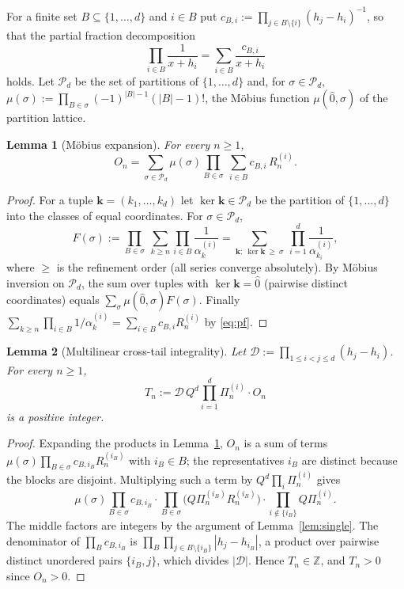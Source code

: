 \documentclass[11pt]{amsart}
\newtheorem{lemma}{Lemma}[section]
\theoremstyle{definition}
\theoremstyle{remark}
\newcommand{\Z}{\mathbb{Z}}
\begin{document}
For a finite set $B\subseteq\{1,\dots,d\}$ and $i\in B$ put
$c_{B,i}:=\prod_{j\in B\setminus\{i\}}(h_j-h_i)^{-1}$, so that the partial fraction
decomposition
\begin{equation}\label{eq:pf}
\prod_{i\in B}\frac1{x+h_i}=\sum_{i\in B}\frac{c_{B,i}}{x+h_i}
\end{equation}
holds. Let $\mathcal P_d$ be the set of partitions of $\{1,\dots,d\}$ and, for
$\sigma\in\mathcal P_d$, $\mu(\sigma):=\prod_{B\in\sigma}(-1)^{|B|-1}(|B|-1)!$, the
M\"obius function $\mu(\hat0,\sigma)$ of the partition lattice.

\begin{lemma}[M\"obius expansion]\label{lem:moebius}
For every $n\ge1$,
\[
O_n=\sum_{\sigma\in\mathcal P_d}\mu(\sigma)\prod_{B\in\sigma}\ \sum_{i\in B}c_{B,i}\,R^{(i)}_n .
\]
\end{lemma}

\begin{proof}
For a tuple $\mathbf k=(k_1,\dots,k_d)$ let $\ker\mathbf k\in\mathcal P_d$ be the partition
of $\{1,\dots,d\}$ into the classes of equal coordinates. For $\sigma\in\mathcal P_d$,
\[
F(\sigma):=\prod_{B\in\sigma}\ \sum_{k\ge n}\prod_{i\in B}\frac1{\alpha_k^{(i)}}
=\sum_{\mathbf k:\ \ker\mathbf k\ \ge\ \sigma}\ \prod_{i=1}^d\frac1{\alpha^{(i)}_{k_i}},
\]
where $\ge$ is the refinement order (all series converge absolutely). By M\"obius
inversion on $\mathcal P_d$, the sum over tuples with $\ker\mathbf k=\hat0$ (pairwise
distinct coordinates) equals $\sum_\sigma\mu(\hat0,\sigma)F(\sigma)$. Finally
$\sum_{k\ge n}\prod_{i\in B}1/\alpha^{(i)}_k=\sum_{i\in B}c_{B,i}R^{(i)}_n$ by
\eqref{eq:pf}.
\end{proof}

\begin{lemma}[Multilinear cross-tail integrality]\label{lem:multi}
Let $\mathcal D:=\prod_{1\le i<j\le d}(h_j-h_i)$. For every $n\ge1$,
\[
T_n:=\mathcal D\,Q^d\prod_{i=1}^d\Pi^{(i)}_n\cdot O_n
\]
is a positive integer.
\end{lemma}

\begin{proof}
Expanding the products in Lemma~\ref{lem:moebius}, $O_n$ is a sum of terms
$\mu(\sigma)\prod_{B\in\sigma}c_{B,i_B}R^{(i_B)}_n$ with $i_B\in B$; the
representatives $i_B$ are distinct because the blocks are disjoint. Multiplying such a
term by $Q^d\prod_i\Pi^{(i)}_n$ gives
\[
\mu(\sigma)\prod_{B\in\sigma}c_{B,i_B}\cdot\prod_{B\in\sigma}\bigl(Q\Pi^{(i_B)}_nR^{(i_B)}_n\bigr)
\cdot\prod_{i\notin\{i_B\}}Q\Pi^{(i)}_n .
\]
The middle factors are integers by the argument of Lemma~\ref{lem:single}. The
denominator of $\prod_Bc_{B,i_B}$ is
$\prod_B\prod_{j\in B\setminus\{i_B\}}|h_j-h_{i_B}|$, a product over pairwise
distinct unordered pairs $\{i_B,j\}$, which divides $|\mathcal D|$. Hence
$T_n\in\Z$, and $T_n>0$ since $O_n>0$.
\end{proof}
\end{document}
